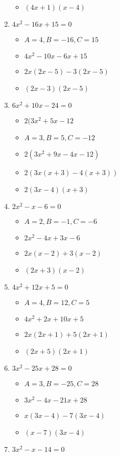 \documentclass{article}
\begin{document}
\begin{enumerate}
\begin{itemize}
  \item $(4x+1)(x-4)$
  \end{itemize}
\item $4x^{2} - 16x + 15 = 0$
  \begin{itemize}
  \item $A=4, B=-16, C=15$
  \item $4x^{2}-10x-6x+15$
  \item $2x(2x-5)-3(2x-5)$
  \item $(2x-3)(2x-5)$
  \end{itemize}
\item $6x^{2} + 10x - 24 = 0$
  \begin{itemize}
  \item $2(3x^{2}+5x-12$
  \item $A=3, B=5, C=-12$
  \item $2(3x^{2}+9x-4x-12)$
  \item $2(3x(x+3)-4(x+3))$
  \item $2(3x-4)(x+3)$
  \end{itemize}
\item $2x^{2} - x - 6 = 0$
  \begin{itemize}
  \item $A=2, B=-1, C=-6$
  \item $2x^{2}-4x+3x-6$
  \item $2x(x-2)+3(x-2)$
  \item $(2x+3)(x-2)$
  \end{itemize}
\item $4x^{2} + 12x + 5 = 0$
  \begin{itemize}
  \item $A=4, B=12, C=5$
  \item $4x^{2}+2x+10x+5$
  \item $2x(2x+1)+5(2x+1)$
  \item $(2x+5)(2x+1)$
  \end{itemize}
\item $3x^{2} - 25x + 28 = 0$
  \begin{itemize}
  \item $A=3, B=-25, C=28$
  \item $3x^{2}-4x-21x+28$
  \item $x(3x-4)-7(3x-4)$
  \item $(x-7)(3x-4)$
  \end{itemize}
\item $3x^{2} - x - 14 = 0$
  \begin{itemize}

\end{itemize}
\end{enumerate}
\end{document}
